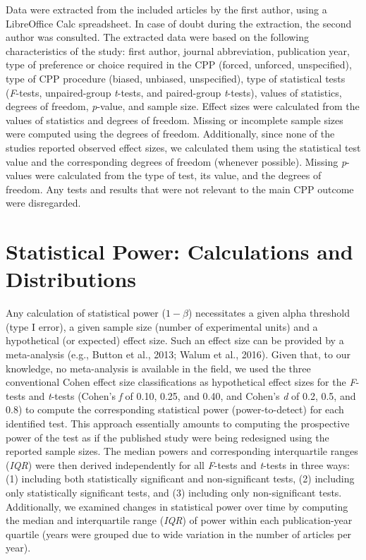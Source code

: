 \documentclass[authordate, meta, issue]{jote-new-article}
\begin{document}
	Data were extracted from the included articles by the first author, using a LibreOffice Calc spreadsheet. In case of doubt during the extraction, the second author was consulted. The extracted data were based on the following characteristics of the study: first author, journal abbreviation, publication year, type of preference or choice required in the CPP (forced, unforced, unspecified), type of CPP procedure (biased, unbiased, unspecified), type of statistical tests (\emph{F}-tests, unpaired-group \emph{t}-tests, and paired-group \emph{t}-tests), values of statistics, degrees of freedom, \emph{p}-value, and sample size. Effect sizes were calculated from the values of statistics and degrees of freedom. Missing or incomplete sample sizes were computed using the degrees of freedom. Additionally, since none of the studies reported observed effect sizes, we calculated them using the statistical test value and the corresponding degrees of freedom (whenever possible). Missing \emph{p}-values were calculated from the type of test, its value, and the degrees of freedom. Any tests and results that were not relevant to the main CPP outcome were disregarded.



	\section{Statistical Power: Calculations and Distributions}



	Any calculation of statistical power ($1-\beta$) necessitates a given alpha threshold (type I error), a given sample size (number of experimental units) and a hypothetical (or expected) effect size. Such an effect size can be provided by a meta-analysis (e.g., Button et al., 2013; Walum et al., 2016). Given that, to our knowledge, no meta-analysis is available in the field, we used the three conventional Cohen effect size classifications as hypothetical effect sizes for the \emph{F}-tests and \emph{t}-tests (Cohen's \emph{f} of 0.10, 0.25, and 0.40, and Cohen's \emph{d} of 0.2, 0.5, and 0.8) to compute the corresponding statistical power (power-to-detect) for each identified test. This approach essentially amounts to computing the prospective power of the test as if the published study were being redesigned using the reported sample sizes. The median powers and corresponding interquartile ranges (\emph{IQR}) were then derived independently for all \emph{F}-tests and \emph{t}-tests in three ways: (1) including both statistically significant and non-significant tests, (2) including only statistically significant tests, and (3) including only non-significant tests. Additionally, we examined changes in statistical power over time by computing the median and interquartile range (\emph{IQR}) of power within each publication-year quartile (years were grouped due to wide variation in the number of articles per year).
\end{document}
